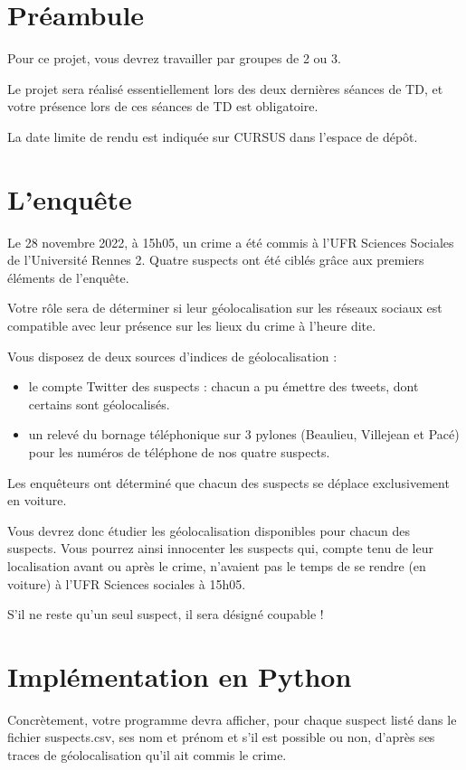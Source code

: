 \documentclass[11pt,a4paper]{article}
\begin{document}
\section{Préambule}

Pour ce projet, vous devrez travailler par groupes de 2 ou 3.

Le projet sera réalisé essentiellement lors des deux dernières séances de TD, et votre présence lors de ces séances de TD est obligatoire.

La date limite de rendu est indiquée sur CURSUS dans l’espace de dépôt.


\section{L'enquête}

Le 28 novembre 2022, à 15h05, un crime a été commis à l’UFR Sciences Sociales de l’Université Rennes 2. Quatre suspects ont été ciblés grâce aux premiers éléments de l’enquête. 

Votre rôle sera de déterminer si leur géolocalisation sur les réseaux sociaux est compatible avec leur présence sur les lieux du crime à l’heure dite.

Vous disposez de deux sources d'indices de géolocalisation : 
\begin{itemize}
    \item le compte Twitter des suspects : chacun a pu émettre des tweets, dont certains sont géolocalisés. 
    \item un relevé du bornage téléphonique sur 3 pylones (Beaulieu, Villejean et Pacé) pour les numéros de téléphone de nos quatre suspects.
\end{itemize}

Les enquêteurs ont déterminé que chacun des suspects se déplace exclusivement en voiture. 

Vous devrez donc étudier les géolocalisation disponibles pour chacun des suspects. Vous pourrez ainsi innocenter les suspects qui, compte tenu de leur localisation avant ou après le crime, n'avaient pas le temps de se rendre (en voiture) à l'UFR Sciences sociales à 15h05. 

S'il ne reste qu'un seul suspect, il sera désigné coupable !

\section{Implémentation en Python}

Concrètement, votre programme devra afficher, pour chaque suspect listé dans le fichier suspects.csv, ses nom et prénom et s’il est possible ou non, d’après ses traces de géolocalisation qu’il ait commis le crime.
\end{document}
